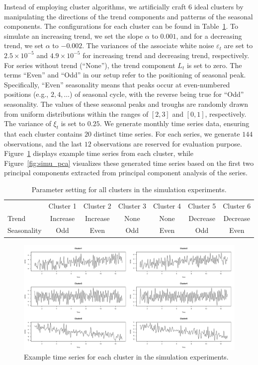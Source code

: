 \documentclass[a4paper,review,12pt,authoryear]{elsarticle}
\begin{document}
Instead of employing cluster algorithms, we artificially craft $6$ ideal clusters by manipulating the directions of the trend components and patterns of the seasonal components.
The configurations for each cluster can be found in Table~\ref{table:simu_params}. To simulate an increasing trend, we set the slope $\alpha$ to $0.001$, and for a decreasing trend, we set $\alpha$ to $-0.002$. The variances of the associate white noise $\varepsilon_t$ are set to $2.5\times 10^{-5}$ and $4.9\times 10^{-5}$ for increasing trend and decreasing trend, respectively. For series without trend (``None''), the trend component $L_t$ is set to zero. The terms ``Even'' and ``Odd'' in our setup refer to the positioning of seasonal peak. Specifically, ``Even'' seasonality means that peaks occur at even-numbered positions (e.g., $2, 4, \dots$) of seasonal cycle, with the reverse being true for ``Odd'' seasonality. The values of these seasonal peaks and troughs are randomly drawn from uniform distributions within the ranges of $[2, 3]$ and $[0,1]$, respectively. The variance of $\xi_t$ is set to $0.25$. We generate monthly time series data, ensuring that each cluster contains $20$ distinct time series. For each series, we generate $144$ observations, and the last $12$ observations are reserved for evaluation purpose. Figure~\ref{fig:simu_emps} displays example time series from each cluster, while Figure~\ref{fig:simu_pca} visualizes these generated time series based on the first two principal components extracted from principal component analysis of the series.

\begin{table}
\caption{\label{table:simu_params}Parameter setting for all clusters in the simulation experiments.}
\centering
\begin{tabular}{lcccccc}\toprule
& Cluster 1 & Cluster 2 & Cluster 3 & Cluster 4 & Cluster 5 & Cluster 6 \\
Trend & Increase & Increase & None & None & Decrease & Decrease \\
Seasonality & Odd & Even & Odd & Even & Odd & Even  \\
    \bottomrule
\end{tabular}
\end{table}

\begin{figure}
\centering
\includegraphics[width=\textwidth]{figures/simu_example.pdf}
\caption{\label{fig:simu_emps}Example time series for each cluster in the simulation experiments.}
\end{figure}
\end{document}
